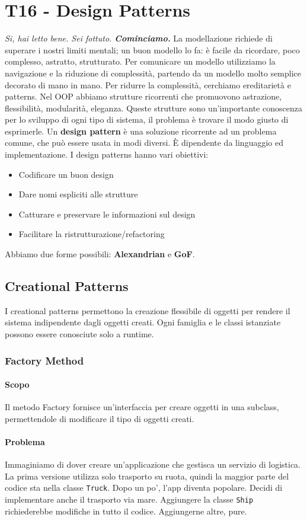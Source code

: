 \documentclass[11pt]{article}
\newcommand{\code}[1]{\texttt{#1}}
\begin{document}
\section{T16 - Design Patterns}
\textit{Si, hai letto bene. Sei fottuto. \textbf{Cominciamo.}}
La modellazione richiede di superare i nostri limiti mentali; un buon modello lo fa: è facile da ricordare, poco complesso, astratto, strutturato. Per comunicare un modello utilizziamo la navigazione e la riduzione di complessità, partendo da un modello molto semplice decorato di mano in mano. Per ridurre la complessità, cerchiamo ereditarietà e patterns. Nel OOP abbiamo strutture ricorrenti che promuovono astrazione, flessibilità, modularità, eleganza. Queste strutture sono un'importante conoscenza per lo sviluppo di ogni tipo di sistema, il problema è trovare il modo giusto di esprimerle. 
Un \textbf{design pattern} è una soluzione ricorrente ad un problema comune, che può essere usata in modi diversi. È dipendente da linguaggio ed implementazione. I design patterns hanno vari obiettivi:
\begin{itemize}
    \item Codificare un buon design
    \item Dare nomi espliciti alle strutture
    \item Catturare e preservare le informazioni sul design 
    \item Facilitare la ristrutturazione/refactoring 
\end{itemize}
Abbiamo due forme possibili: \textbf{Alexandrian} e \textbf{GoF}.
\subsection{Creational Patterns}
I creational patterns permettono la creazione flessibile di oggetti per rendere il sistema indipendente dagli oggetti creati. Ogni famiglia e le classi istanziate possono essere conosciute solo a runtime. 
\subsubsection{Factory Method}
\paragraph{Scopo}
Il metodo Factory fornisce un'interfaccia per creare oggetti in una subclass, permettendole di modificare il tipo di oggetti creati.
\paragraph{Problema}
Immaginiamo di dover creare un'applicazione che gestisca un servizio di logistica. La prima versione utilizza solo trasporto su ruota, quindi la maggior parte del codice sta nella classe \code{Truck}. Dopo un po', l'app diventa popolare. Decidi di implementare anche il trasporto via mare. Aggiungere la classe \code{Ship} richiederebbe modifiche in tutto il codice. Aggiungerne altre, pure.
\end{document}
